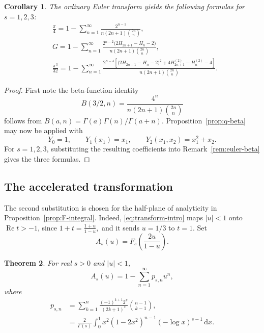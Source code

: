 \documentclass[11pt,reqno]{amsart}
\numberwithin{equation}{section}
\newtheorem{theorem}{Theorem}[section]
\newtheorem{corollary}[theorem]{Corollary}
\theoremstyle{definition}
\theoremstyle{remark}
\DeclareMathOperator{\RePart}{Re}
\newcommand{\dd}{\,\mathrm{d}}
\newcommand{\Gconst}{G}
\begin{document}
\begin{corollary}\label{cor:beta-first-three}
The ordinary Euler transform yields the following formulas for
\(s=1,2,3\):
\begin{align*}
 & \frac{\pi}{4}
 =
 1-\sum_{n=1}^{\infty}
 \frac{2^{n-1}}
 {n(2n+1)\binom{2n}{n}}, \\&
 \Gconst
 =
 1-\sum_{n=1}^{\infty}
 \frac{
 2^{n-2}\bigl(2H_{2n+1}-H_n-2\bigr)}
 {n(2n+1)\binom{2n}{n}},\\&
 \frac{\pi^3}{32}
 =
 1-\sum_{n=1}^{\infty}
 \frac{
 2^{n-4}
 \left[
 \bigl(2H_{2n+1}-H_n-2\bigr)^2
 +4H_{2n+1}^{(2)}-H_n^{(2)}-4
 \right]}
 {n(2n+1)\binom{2n}{n}}.
\end{align*}
\end{corollary}
\begin{proof}
First note the beta-function identity
\[
 B(3/2,n)
 =\frac{4^n}{n(2n+1)\binom{2n}{n}}
\]
follows from \(B(a,n)=\Gamma(a)\Gamma(n)/\Gamma(a+n)\).
Proposition~\ref{prop:q-beta} may now be applied with
\[
 Y_0=1,\qquad
 Y_1(x_1)=x_1,\qquad
 Y_2(x_1,x_2)=x_1^2+x_2.
\]
For \(s=1,2,3\), substituting the resulting coefficients into
Remark~\ref{rem:euler-beta} gives the three formulas.
\end{proof}

\subsection{The accelerated transformation}

The second substitution is chosen for the half-plane of analyticity
in Proposition~\ref{prop:F-integral}.  Indeed,
\eqref{eq:transform-intro} maps \(|u|<1\) onto \(\RePart t>-1\), since
\(
 1+t=\frac{1+u}{1-u},
\)
and it sends \(u=1/3\) to \(t=1\).  Set
\begin{equation}\label{eq:A-definition}
 A_s(u)=F_s\!\left(\frac{2u}{1-u}\right).
\end{equation}

\begin{theorem}\label{thm:p-coefficients}
For real \(s>0\) and \(|u|<1\),
\begin{equation}\label{eq:A-expansion}
 A_s(u)=1-\sum_{n=1}^{\infty}p_{s,n}u^n,
\end{equation}
where
\begin{align}
 p_{s,n}
 &=\sum_{k=1}^{n}
   \frac{(-1)^{k+1}2^k}{(2k+1)^s}
   \binom{n-1}{k-1},                     \label{eq:p-finite}\\
 &=\frac2{\Gamma(s)}
   \int_0^1x^2(1-2x^2)^{n-1}
   (-\log x)^{s-1}\dd x.                 \label{eq:p-integral}
\end{align}

\end{theorem}
\end{document}
